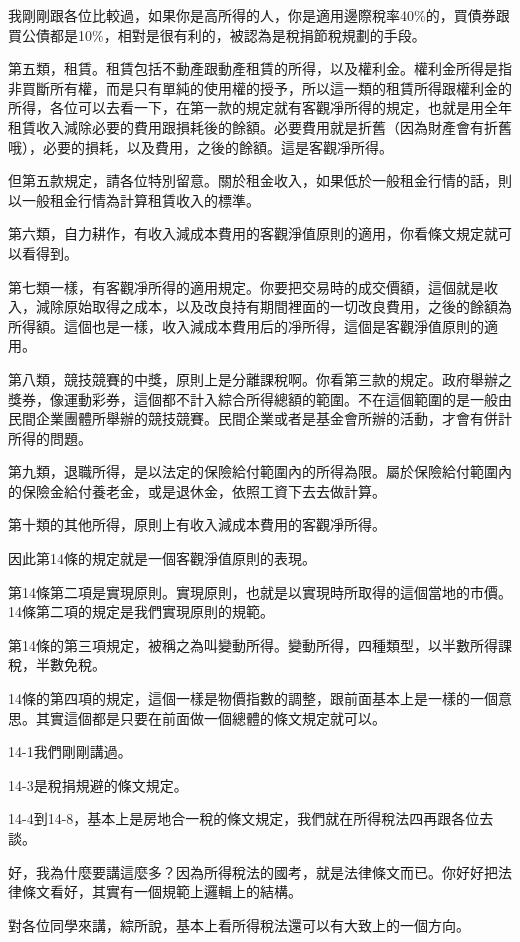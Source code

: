 \documentclass[oneside,sub3section]{ctexbook}
\begin{document}
我剛剛跟各位比較過，如果你是高所得的人，你是適用邊際稅率40\%的，買債券跟買公債都是10\%，相對是很有利的，被認為是稅捐節稅規劃的手段。

第五類，租賃。租賃包括不動產跟動產租賃的所得，以及權利金。權利金所得是指非買斷所有權，而是只有單純的使用權的授予，所以這一類的租賃所得跟權利金的所得，各位可以去看一下，在第一款的規定就有客觀凈所得的規定，也就是用全年租賃收入減除必要的費用跟損耗後的餘額。必要費用就是折舊（因為財產會有折舊哦），必要的損耗，以及費用，之後的餘額。這是客觀凈所得。

但第五款規定，請各位特別留意。關於租金收入，如果低於一般租金行情的話，則以一般租金行情為計算租賃收入的標準。

第六類，自力耕作，有收入減成本費用的客觀淨值原則的適用，你看條文規定就可以看得到。

第七類一樣，有客觀凈所得的適用規定。你要把交易時的成交價額，這個就是收入，減除原始取得之成本，以及改良持有期間裡面的一切改良費用，之後的餘額為所得額。這個也是一樣，收入減成本費用后的凈所得，這個是客觀淨值原則的適用。

第八類，競技競賽的中獎，原則上是分離課稅啊。你看第三款的規定。政府舉辦之獎券，像運動彩券，這個都不計入綜合所得總額的範圍。不在這個範圍的是一般由民間企業團體所舉辦的競技競賽。民間企業或者是基金會所辦的活動，才會有併計所得的問題。

第九類，退職所得，是以法定的保險給付範圍內的所得為限。屬於保險給付範圍內的保險金給付養老金，或是退休金，依照工資下去去做計算。

第十類的其他所得，原則上有收入減成本費用的客觀凈所得。

因此第14條的規定就是一個客觀淨值原則的表現。

第14條第二項是實現原則。實現原則，也就是以實現時所取得的這個當地的市價。14條第二項的規定是我們實現原則的規範。

第14條的第三項規定，被稱之為叫變動所得。變動所得，四種類型，以半數所得課稅，半數免稅。

14條的第四項的規定，這個一樣是物價指數的調整，跟前面基本上是一樣的一個意思。其實這個都是只要在前面做一個總體的條文規定就可以。

14-1我們剛剛講過。

14-3是稅捐規避的條文規定。

14-4到14-8，基本上是房地合一稅的條文規定，我們就在所得稅法四再跟各位去談。

好，我為什麼要講這麼多？因為所得稅法的國考，就是法律條文而已。你好好把法律條文看好，其實有一個規範上邏輯上的結構。

對各位同學來講，綜所說，基本上看所得稅法還可以有大致上的一個方向。
\end{document}
